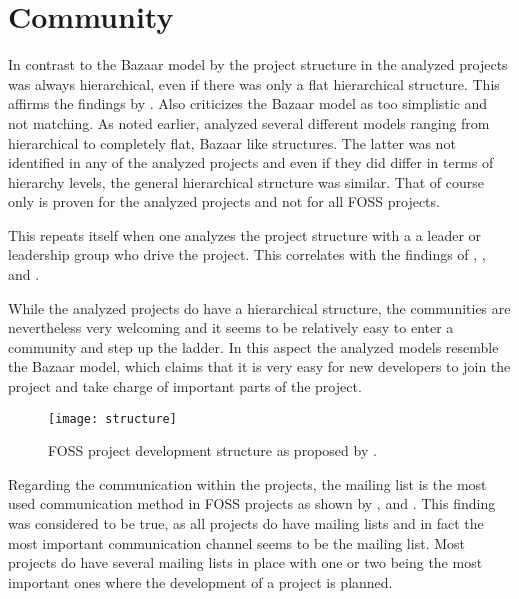 
\section{Community} %

In contrast to the Bazaar model by \textcite{Raymond1998} the project structure
in the analyzed projects was always hierarchical, even if there was only a flat
hierarchical structure. This affirms the findings by \textcite{Crowston2005}.
Also \textcite{Bezroukov1999,Bezroukov1999a} criticizes the Bazaar model as too
simplistic and not matching. As noted earlier, \textcite{Ghosh2005} analyzed
several different models ranging from hierarchical to completely flat, Bazaar
like structures. The latter was not identified in any of the analyzed projects
and even if they did differ in terms of hierarchy levels, the general
hierarchical structure was similar. That of course only is proven for the
analyzed projects and not for all \ac{FOSS} projects.

This repeats itself when one analyzes the project structure with a a leader or
leadership group who drive the project. This correlates with the findings of
\textcite{Johnson2001}, \textcite{Crowston2005a}, \textcite{Warsta2003} and
\textcite{Krishnamurthy2002}.

While the analyzed projects do have a hierarchical structure, the communities
are nevertheless very welcoming and it seems to be relatively easy to enter a
community and step up the ladder. In this aspect the analyzed models resemble
the Bazaar model, which claims that it is very easy for new developers to join
the project and take charge of important parts of the project.

\begin{figure}[htbp]
  \centering
  \texttt{[image: structure]}
  \caption[\acl{FOSS} project development structure]
  {\acl{FOSS} project development structure as proposed by \textcite{Crowston2005}.}
\end{figure}

Regarding the communication within the projects, the mailing list is the most
used communication method in \ac{FOSS} projects as shown by
\textcite{Schweik2003}, \textcite{Ogawa2007} and \textcite{Kim2003}. This
finding was considered to be true, as all projects do have mailing lists and in
fact the most important communication channel seems to be the mailing list.
Most projects do have several mailing lists in place with one or two being the
most important ones where the development of a project is planned.

